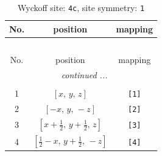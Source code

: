 \documentclass[fleqn,8pt]{jsarticle}
\begin{document}
\begin{longtable}{ccc}
\caption{Wyckoff site: {\tt 4c}, site symmetry: {\tt 1}}
 \\
 \hline \hline
No. & position & mapping \\ \hline \endfirsthead

\multicolumn{2}{l}{\tablename\ \thetable{}} \\
 \hline \hline
No. & position & mapping \\ \hline \endhead

 \hline \hline
\multicolumn{2}{r}{\footnotesize\it continued ...} \\ \endfoot

 \hline \hline
\multicolumn{2}{r}{} \\ \endlastfoot

1 & $\left[ x,\, y,\, z \right]$ & {\tt [1]} \\ \hline
2 & $\left[ - x,\, y,\, - z \right]$ & {\tt [2]} \\ \hline
3 & $\left[ x + \frac{1}{2},\, y + \frac{1}{2},\, z \right]$ & {\tt [3]} \\ \hline
4 & $\left[ \frac{1}{2} - x,\, y + \frac{1}{2},\, - z \right]$ & {\tt [4]} \\
\end{longtable}
\end{document}

